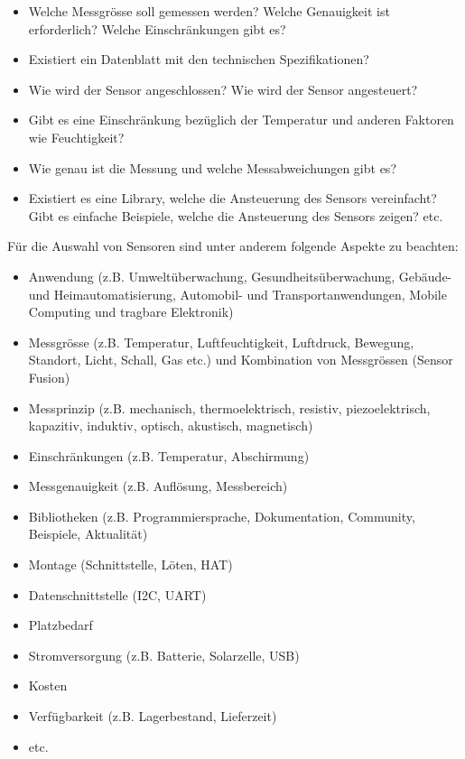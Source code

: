 \documentclass[
  11pt,
  a4paperpaper,
  oneside, openany  ,captions=tableheading
]{scrbook}
\providecommand{\tightlist}{%
  \setlength{\itemsep}{0pt}\setlength{\parskip}{0pt}}
\theoremstyle{definition}
\theoremstyle{remark}
\begin{document}
\begin{itemize}
\tightlist
\item
  Welche Messgrösse soll gemessen werden? Welche Genauigkeit ist
  erforderlich? Welche Einschränkungen gibt es?
\item
  Existiert ein Datenblatt mit den technischen Spezifikationen?\\
\item
  Wie wird der Sensor angeschlossen? Wie wird der Sensor angesteuert?\\
\item
  Gibt es eine Einschränkung bezüglich der Temperatur und anderen
  Faktoren wie Feuchtigkeit?
\item
  Wie genau ist die Messung und welche Messabweichungen gibt es?
\item
  Existiert es eine Library, welche die Ansteuerung des Sensors
  vereinfacht? Gibt es einfache Beispiele, welche die Ansteuerung des
  Sensors zeigen? etc.
\end{itemize}

Für die Auswahl von Sensoren sind unter anderem folgende Aspekte zu
beachten:

\begin{itemize}
\tightlist
\item
  Anwendung (z.B. Umweltüberwachung, Gesundheitsüberwachung, Gebäude-
  und Heimautomatisierung, Automobil- und Transportanwendungen, Mobile
  Computing und tragbare Elektronik)
\item
  Messgrösse (z.B. Temperatur, Luftfeuchtigkeit, Luftdruck, Bewegung,
  Standort, Licht, Schall, Gas etc.) und Kombination von Messgrössen
  (Sensor Fusion)
\item
  Messprinzip (z.B. mechanisch, thermoelektrisch, resistiv,
  piezoelektrisch, kapazitiv, induktiv, optisch, akustisch, magnetisch)
\item
  Einschränkungen (z.B. Temperatur, Abschirmung)
\item
  Messgenauigkeit (z.B. Auflösung, Messbereich)
\item
  Bibliotheken (z.B. Programmiersprache, Dokumentation, Community,
  Beispiele, Aktualität)
\item
  Montage (Schnittstelle, Löten, HAT)
\item
  Datenschnittstelle (I2C, UART)
\item
  Platzbedarf
\item
  Stromversorgung (z.B. Batterie, Solarzelle, USB)
\item
  Kosten
\item
  Verfügbarkeit (z.B. Lagerbestand, Lieferzeit)
\item
  etc.
\end{itemize}
\end{document}
